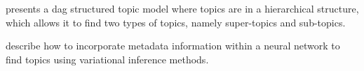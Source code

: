 \citet{li2006pachinko} presents a \gls{dag} structured topic model where topics are in a hierarchical structure, which allows it to find two types of topics, namely super-topics and sub-topics. 


\citet{card2017neural} describe how to incorporate metadata information within a neural network to find topics using variational inference methods.

